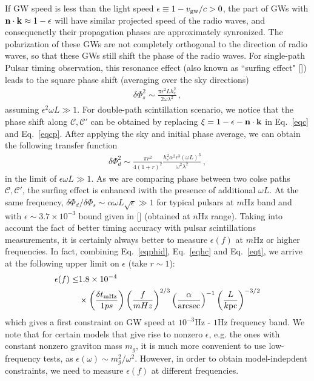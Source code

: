 \documentclass[prl,aps,floatfix,superscriptaddress,twocolumn]{revtex4}
\begin{document}
If GW speed is less than the light speed $\epsilon \equiv 1-v_{\rm gw}/c > 0$, the part of GWs with ${\bf n}\cdot {\bf k} \approx 1-\epsilon$ will have similar projected speed of the radio waves, and consequenctly their propagation phases are approximately synronized. The polarization of these GWs are not completely orthogonal to the direction of radio waves, so that these GWs still shift the phase of the radio waves. For single-path Pulsar timing observation, this resonance effect (also known as ``surfing effect" []) leads to the square phase shift (averaging over the sky directions)
\begin{align}
\delta \Phi^2_s \sim \frac{\pi \epsilon^2 L h_c^2}{2 \omega \lambda^2}\,,
\end{align} 
assuming $\epsilon^2 \omega L \gg 1$. For double-path scintillation scenario, we notice that the phase shift along $\mathcal{C}, \mathcal{C}'$ can be obtained by replacing $\xi = 1-\epsilon-{\bf n}\cdot {\bf k}$ in Eq.~\ref{eqc} and Eq.~\ref{eqcp}. After applying the sky and initial phase average, we can obtain the following transfer function  
\begin{align}\label{eqphid}
\delta \Phi^2_d \sim \frac{\pi r^2}{4(1+r)^2} \frac{h_c^2\alpha^2 \epsilon^3 (\omega L)^3}{\omega^2 \lambda^2}\,,
\end{align}
in the limit of $\epsilon \omega L \gg 1$. As we are comparing phase between two colse paths $\mathcal{C}, \mathcal{C}'$, the surfing effect is enhanced iwith the presence of additional $\omega L$. At the same frequency, $\delta \Phi_d/\delta \Phi_s \sim \alpha \omega L\sqrt{\epsilon} \gg 1$ for typical pulsars at $m$Hz band and with $\epsilon \sim 3.7 \times 10^{-3}$ bound given in [] (obtained at $n$Hz range). Taking into account the fact of better timing accuracy with pulsar scintillations measurements, it is certainly always better to measure $\epsilon(f)$ at $m$Hz or higher frequencies. In fact, combining Eq.~\ref{eqphid}, Eq.~\ref{eqhc} and Eq.~\ref{eqt}, we arrive at the following upper limit on $\epsilon$ (take $r \sim 1$): 
\begin{align}
\epsilon(f) \le& 1.8\times 10^{-4} \nonumber\\ 
&\times \left ( \frac{\delta t_{\rm mHz}}{1 ps}\right )  \left (\frac{f}{ m Hz} \right )^{2/3} \left (\frac{\alpha}{{\rm arcsec}} \right )^{-1} \left ( \frac{L}{k {\rm pc}}\right)^{-3/2}
\end{align}
which gives a first constraint on GW speed at $10^{-3}$Hz - $1$Hz frequency band. We note that for certain models that give rise to nonzero $\epsilon$, e.g. the ones with constant nonzero graviton mass $m_g$, it is much more convenient to use low-frequency tests, as $\epsilon(\omega) \sim m^2_g/\omega^2$. However, in order to obtain model-indepdent constraints, we need to measure $\epsilon(f)$ at different frequencies.
\vspace{0.2cm}
\end{document}
